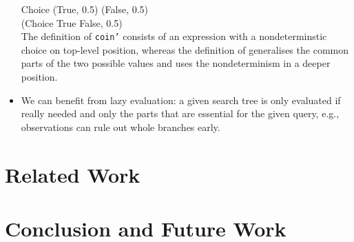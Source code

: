 \documentclass[
12pt, %
a4paper, %
oneside, %
]{llncs}
\newcommand{\code}[1]{{\texttt{#1}}}
\begin{document}
\begin{itemize}
  Choice (True, 0.5) (False, 0.5)\\%
  (Choice True False, 0.5)\\%

  The definition of \code{coin'} consists of an expression with a
  nondeterminstic choice on top-level position, whereas the definition
  of  generalises the common parts of the two possible
  values and uses the nondeterminism in a deeper position. %


\item We can benefit from lazy evaluation: a given search tree is only
  evaluated if really needed and only the parts that are essential for
  the given query, e.g., observations can rule out whole branches
  early. %

\end{itemize}

\section{Related Work}

\section{Conclusion and Future Work}



\end{document}
